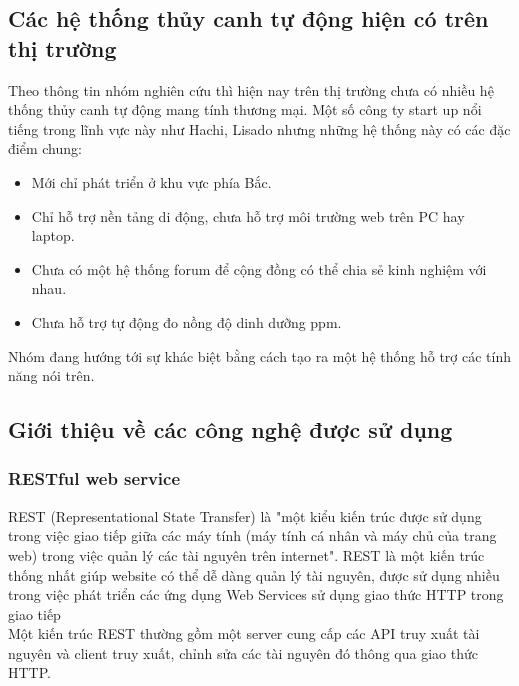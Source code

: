 \documentclass[a4paper,12pt,oneside]{article}
\begin{document}
\subsection{Các hệ thống thủy canh tự động hiện có trên thị trường}
\noindent Theo thông tin nhóm nghiên cứu thì hiện nay trên thị trường chưa có nhiều hệ thống thủy canh tự động mang tính thương mại. Một số công ty start up nổi tiếng trong lĩnh vực này như Hachi, Lisado nhưng những hệ thống này có các đặc điểm chung:
	\begin{itemize}
		\item Mới chỉ phát triển ở khu vực phía Bắc.
		\item Chỉ hỗ trợ nền tảng di động, chưa hỗ trợ môi trường web trên PC hay laptop.
		\item Chưa có một hệ thống forum để cộng đồng có thể chia sẻ kinh nghiệm với nhau.
		\item Chưa hỗ trợ tự động đo nồng độ dinh dưỡng ppm.
	\end{itemize} 
\noindent Nhóm đang hướng tới sự khác biệt bằng cách tạo ra một hệ thống hỗ trợ các tính năng nói trên.
\subsection{Giới thiệu về các công nghệ được sử dụng}

\subsubsection{RESTful web service}
\noindent REST (Representational State Transfer)  là "một kiểu kiến trúc được sử dụng trong việc giao tiếp giữa các máy tính (máy tính cá nhân và máy chủ của trang web) trong việc quản lý các tài nguyên trên internet"\cite{restful}. REST là một kiến trúc thống nhất giúp website có thể dễ dàng quản lý tài nguyên, được sử dụng nhiều trong việc phát triển các ứng dụng Web Services sử dụng giao thức HTTP trong giao tiếp\\
\noindent Một kiến trúc REST thường gồm một server cung cấp các API truy xuất tài nguyên và client truy xuất, chỉnh sửa các tài nguyên đó thông qua giao thức HTTP.\\
\end{document}
